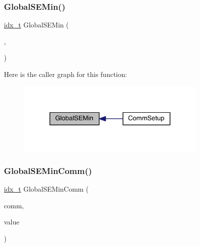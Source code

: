 \mbox{\label{a00951_a6acfe2514c7c9ca7cd7893b1925dc7e3}} 
\subsubsection{\texorpdfstring{Global\+S\+E\+Min()}{GlobalSEMin()}}
{\footnotesize\ttfamily \hyperlink{a00876_aaa5262be3e700770163401acb0150f52}{idx\+\_\+t} Global\+S\+E\+Min (\begin{DoxyParamCaption}\item[{\hyperlink{a00742}{ctrl\+\_\+t} $\ast$}]{,  }\item[{\hyperlink{a00876_aaa5262be3e700770163401acb0150f52}{idx\+\_\+t}}]{ }\end{DoxyParamCaption})}

Here is the caller graph for this function\+:\nopagebreak
\begin{figure}[H]
\begin{center}
\leavevmode
\includegraphics[width=264pt]{a00951_a6acfe2514c7c9ca7cd7893b1925dc7e3_icgraph}
\end{center}
\end{figure}
\mbox{\label{a00951_a44bc5168b7fcc675e4e07293a712f12b}} 
\subsubsection{\texorpdfstring{Global\+S\+E\+Min\+Comm()}{GlobalSEMinComm()}}
{\footnotesize\ttfamily \hyperlink{a00876_aaa5262be3e700770163401acb0150f52}{idx\+\_\+t} Global\+S\+E\+Min\+Comm (\begin{DoxyParamCaption}\item[{M\+P\+I\+\_\+\+Comm}]{comm,  }\item[{\hyperlink{a00876_aaa5262be3e700770163401acb0150f52}{idx\+\_\+t}}]{value }\end{DoxyParamCaption})}

